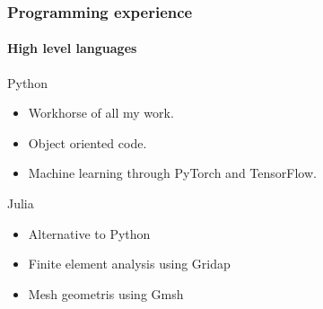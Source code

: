 \documentclass[
	10pt, %
]{beamer}
\begin{document}
\begin{frame}
	\frametitle{Programming experience}
	\framesubtitle{High level languages}

	{\large Python} 
	\begin{itemize}
		\item Workhorse of all my work.
		\item Object oriented code.
		\item Machine learning through PyTorch and TensorFlow.
	\end{itemize}

	{\large Julia} 
	\begin{itemize}
		\item Alternative to Python 
		\item Finite element analysis using Gridap
		\item Mesh geometris using Gmsh
	\end{itemize}


\end{frame}
\end{document}
